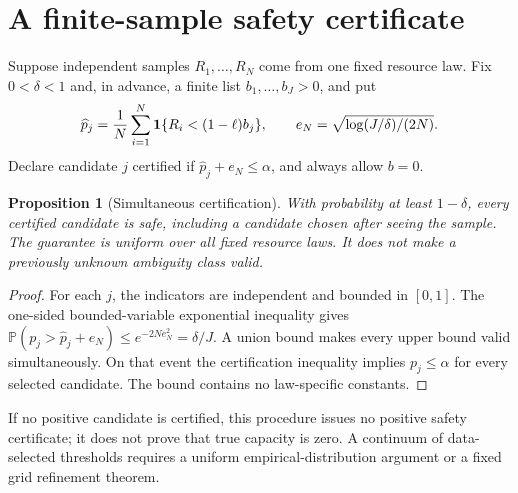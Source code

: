 \documentclass[11pt,a4paper]{article}
\newtheorem{proposition}[theorem]{Proposition}
\theoremstyle{definition}
\theoremstyle{remark}
\newcommand{\Prob}{\mathbb{P}}
\newcommand{\ind}{\mathbf{1}}
\begin{document}
\section{A finite-sample safety certificate}
Suppose independent samples $R_1,\ldots,R_N$ come from one fixed resource law. Fix $0<\delta<1$ and, in advance, a finite list $b_1,\ldots,b_J>0$, and put
\[
 \widehat p_j={1\over N}\sum_{i=1}^N
       \ind\{R_i<(1-\ell)b_j\},\qquad
 e_N=\sqrt{\log(J/\delta)/(2N)}.
\]
Declare candidate $j$ certified if $\widehat p_j+e_N\le\alpha$, and always allow $b=0$.
\begin{proposition}[Simultaneous certification]
With probability at least $1-\delta$, every certified candidate is safe, including a candidate chosen after seeing the sample. The guarantee is uniform over all fixed resource laws. It does not make a previously unknown ambiguity class valid.
\end{proposition}
\begin{proof}
For each $j$, the indicators are independent and bounded in $[0,1]$. The one-sided bounded-variable exponential inequality gives
$\Prob(p_j>\widehat p_j+e_N)\le e^{-2Ne_N^2}=\delta/J$.
A union bound makes every upper bound valid simultaneously. On that event the certification inequality implies $p_j\le\alpha$ for every selected candidate. The bound contains no law-specific constants.
\end{proof}
If no positive candidate is certified, this procedure issues no positive safety certificate; it does not prove that true capacity is zero. A continuum of data-selected thresholds requires a uniform empirical-distribution argument or a fixed grid refinement theorem.
\end{document}
